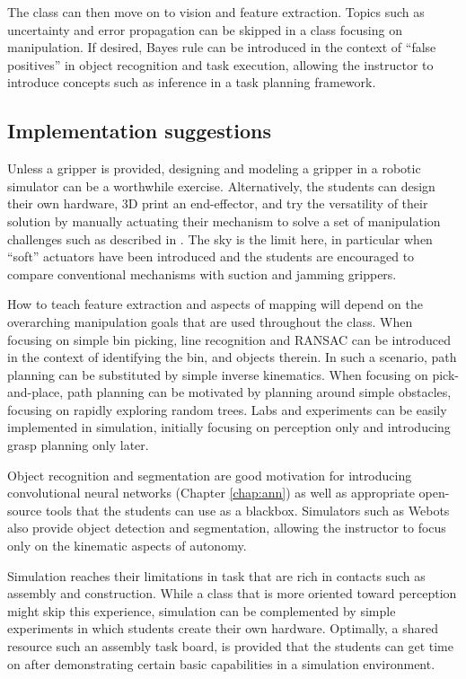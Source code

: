 The class can then move on to vision and feature extraction. Topics such as uncertainty and error propagation can be skipped in a class focusing on manipulation. If desired, Bayes rule can be introduced in the context of ``false positives'' in object recognition and task execution, allowing the instructor to introduce concepts such as inference in a task planning framework. 

\subsection{Implementation suggestions}

Unless a gripper is provided, designing and modeling a gripper in a robotic simulator can be a worthwhile exercise. Alternatively, the students can design their own hardware, 3D print an end-effector, and try the versatility of their solution by manually actuating their mechanism to solve a set of manipulation challenges such as described in \cite{patel2016manipulation}. The sky is the limit here, in particular when ``soft'' actuators have been introduced and the students are encouraged to compare conventional mechanisms with suction and jamming grippers. 

How to teach feature extraction and aspects of mapping will depend on the overarching manipulation goals that are used throughout the class. When focusing on simple bin picking, line recognition and RANSAC can be introduced in the context of identifying the bin, and objects therein. In such a scenario, path planning can be substituted by simple inverse kinematics. When focusing on pick-and-place, path planning can be motivated by planning around simple obstacles, focusing on rapidly exploring random trees. Labs and experiments can be easily implemented in simulation, initially focusing on perception only and introducing grasp planning only later. 

Object recognition and segmentation are good motivation for introducing convolutional neural networks (Chapter \cref{chap:ann}) as well as appropriate open-source tools that the students can use as a blackbox. Simulators such as Webots also provide object detection and segmentation, allowing the instructor to focus only on the kinematic aspects of autonomy. 

Simulation reaches their limitations in task that are rich in contacts such as assembly and construction. While a class that is more oriented toward perception might skip this experience, simulation can be complemented by simple experiments in which students create their own hardware. Optimally, a shared resource such an assembly task board, is provided that the students can get time on after demonstrating certain basic capabilities in a simulation environment. 

